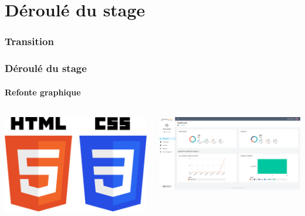 \documentclass[aspectratio=169]{beamer}
\begin{document}
\section{Déroulé du stage}
\begin{frame}
    \frametitle{Transition}
    \framesubtitle{}
    \tableofcontents[currentsubsection,sectionstyle=show/shaded,subsectionstyle=show/shaded/hide]
\end{frame}
\begin{frame}
    \frametitle{Déroulé du stage}
    \framesubtitle{Refonte graphique}
    \begin{columns}
        \begin{column}{0.3\textwidth}
            \begin{center}
                \includegraphics[width=1.0\textwidth]{CSS_HTML.png}
            \end{center}
        \end{column}
        \begin{column}{0.6\textwidth}
            \begin{center}
                \includegraphics[width=1.0\textwidth]{ccm_dashboard.png}
            \end{center}
        \end{column}
    \end{columns}
\end{frame}
\end{document}
